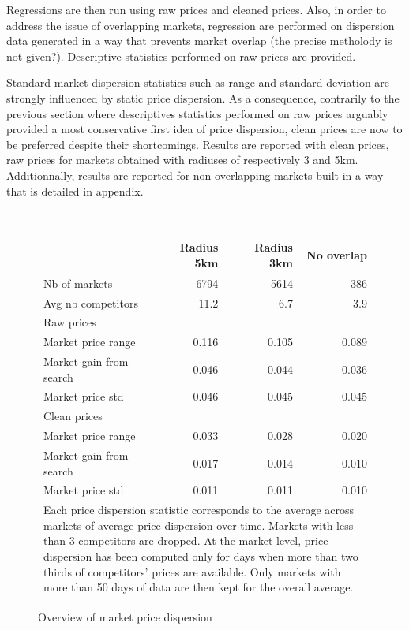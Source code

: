 \documentclass[11pt]{article}
\begin{document}
Regressions are then run using raw prices and cleaned prices. Also, in order to address the issue of overlapping markets, regression are performed on dispersion data generated in a way that prevents market overlap (the precise metholody is not given?). Descriptive statistics performed on raw prices are provided.

Standard market dispersion statistics such as range and standard deviation are strongly influenced by static price dispersion. As a consequence, contrarily to the previous section where descriptives statistics performed on raw prices arguably provided a most conservative first idea of price dispersion, clean prices are now to be preferred despite their shortcomings. Results are reported with clean prices, raw prices for markets obtained with radiuses of respectively 3 and 5km. Additionnally, results are reported for non overlapping markets built in a way that is detailed in appendix.

\ \\
\begin{figure}
\caption{Overview of market price dispersion}
\begin{center}
\begin{tabular}{lrrr}
\hline
{} & Radius 5km & Radius 3km & No overlap\\
\hline
Nb of markets & 6794 & 5614 & 386 \\
Avg nb competitors & 11.2 & 6.7 & 3.9 \\
\hline
Raw prices & & & \\
\hline
Market price range & 0.116 & 0.105 & 0.089\\
Market gain from search & 0.046 & 0.044 & 0.036 \\
Market price std & 0.046 & 0.045 & 0.045 \\
\hline
Clean prices & & & \\
\hline
Market price range & 0.033  & 0.028 & 0.020 \\
Market gain from search & 0.017 & 0.014 & 0.010 \\
Market price std & 0.011 & 0.011 & 0.010 \\
\hline
\multicolumn{4}{p{.8\textwidth}}{Each price dispersion statistic corresponds to the average across markets of average price dispersion over time. Markets with less than 3 competitors are dropped. At the market level, price dispersion has been computed only for days when more than two thirds of competitors' prices are available. Only markets with more than 50 days of data are then kept for the overall average.}
\end{tabular}
\end{center}
\end{figure}
\end{document}
